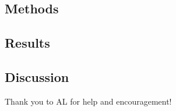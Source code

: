 \documentclass[smallextended]{svjour3}       %
\begin{document}
\subsection{Methods}

\subsection{Results}

\subsection{Discussion}



\begin{acknowledgements}
Thank you to AL for help and encouragement! 
\end{acknowledgements}


%
%



%
%
\end{document}
